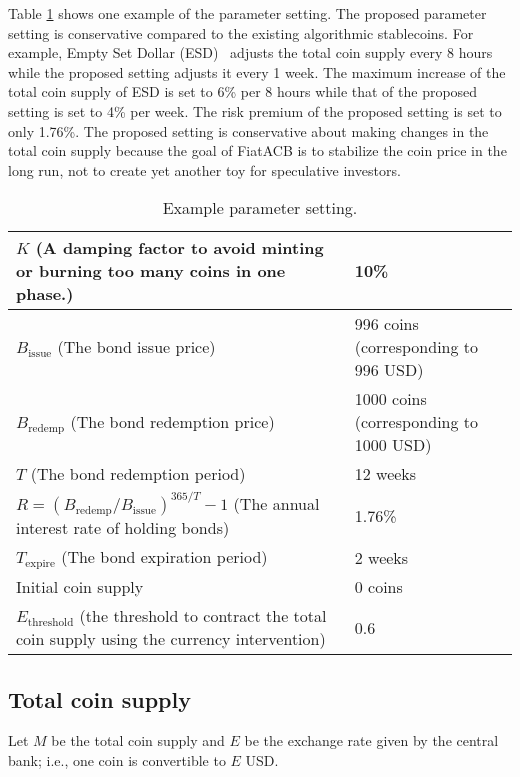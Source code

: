 \documentclass[dvipdfmx,a4paper]{article}
\begin{document}
Table \ref{example_parameters} shows one example of the parameter setting. The proposed parameter setting is conservative compared to the existing algorithmic stablecoins. For example, Empty Set Dollar (ESD)~\cite{emptysetdollar} adjusts the total coin supply every 8 hours while the proposed setting adjusts it every 1 week. The maximum increase of the total coin supply of ESD is set to 6\% per 8 hours while that of the proposed setting is set to 4\% per week. The risk premium of the proposed setting is set to only 1.76\%. The proposed setting is conservative about making changes in the total coin supply because the goal of FiatACB is to stabilize the coin price in the long run, not to create yet another toy for speculative investors.

\begin{table}[tb]
\begin{center}
\caption{Example parameter setting.}\vspace{2ex}
\begin{tabular}{p{22em}|p{18em}}\hline
$K$ (A damping factor to avoid minting or burning too many coins in one phase.) & 10\%\\\hline
$B_{\mathrm{issue}}$ (The bond issue price) & 996 coins (corresponding to 996 USD)\\\hline
$B_{\mathrm{redemp}}$ (The bond redemption price) & 1000 coins (corresponding to 1000 USD)\\\hline
$T$ (The bond redemption period) & 12 weeks\\\hline
$R=(B_{\mathrm{redemp}}/B_{\mathrm{issue}})^{365/T}-1$ (The annual interest rate of holding bonds) & 1.76\%\\\hline
$T_{\mathrm{expire}}$ (The bond expiration period) & 2 weeks\\\hline
Initial coin supply & 0 coins\\\hline
$E_{\mathrm{threshold}}$ (the threshold to contract the total coin supply using the currency intervention) & 0.6\\\hline
\end{tabular}
\label{example_parameters}
\end{center}
\end{table}

\subsection{Total coin supply}

Let $M$ be the total coin supply and $E$ be the exchange rate given by the central bank; i.e., one coin is convertible to $E$ USD.
\end{document}
